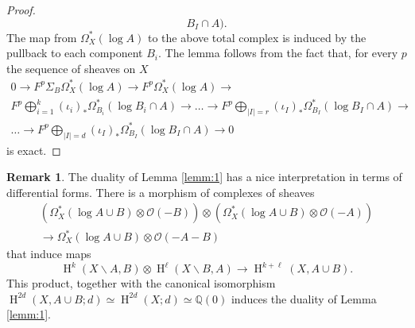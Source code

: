 \documentclass[11pt,a4paper]{amsart}
\newcommand{\Q}{\mathds{Q}}
\newcommand{\caO}{\mathcal{O}}
\DeclareMathOperator{\rH}{H}
\numberwithin{equation}{section}
\theoremstyle{plain}
\theoremstyle{definition}
\newtheorem{rmk}[prop]{Remark}
\begin{document}
\begin{proof}
\begin{displaymath}
    B_{I}\cap A). 
  \end{displaymath}
  The map from $\Omega ^{\ast}_{X}(\log A)$ to the above total complex
  is induced by the pullback to each component $B_i$. The lemma
  follows from the fact that, for every $p$ the sequence of sheaves on $X$
  \begin{multline*}
    0\longrightarrow
    F^{p}\Sigma _B\Omega^{\ast}_{X}(\log A)
    \longrightarrow
    F^{p}\Omega^{\ast}_{X}(\log A)
    \longrightarrow\\
    F^{p}\bigoplus _{i=1}^{k}
    (\iota_{i})_{\ast}\Omega^{\ast}_{B_{i}}(\log B_{i}\cap A)
    \longrightarrow  \dots
    \longrightarrow
    F^{p}\bigoplus _{|I|=r}
    (\iota_{I})_{\ast}\Omega^{\ast}_{B_{I}}(\log B_{I}\cap A)\longrightarrow
    \\\dots \longrightarrow
    F^{p}\bigoplus _{|I|=d}
    (\iota_{I})_{\ast}\Omega^{\ast}_{B_{I}}(\log B_{I}\cap A)
    \longrightarrow 0
  \end{multline*}
  is exact.
\end{proof}

\begin{rmk}  The duality of Lemma \ref{lemm:1} has a nice
  interpretation in terms of differential forms. 
  There is a morphism of complexes of sheaves
  \begin{multline}
    \label{eq:22}
    (\Omega ^{\ast}_{X}(\log A\cup B)\otimes \caO(-B))
    \otimes
    (\Omega ^{\ast}_{X}(\log A\cup B)\otimes \caO(-A))\\
    \longrightarrow \Omega ^{\ast}_{X}(\log A\cup B)\otimes \caO(-A-B) 
  \end{multline}
  that induce maps
  \begin{displaymath}
    \rH^{k}(X\smallsetminus A,B)\otimes
    \rH^{\ell}(X\smallsetminus B,A)
    \longrightarrow
    \rH^{k+\ell}(X,A\cup B).
  \end{displaymath}
  This product, together with the canonical isomorphism
  $\rH^{2d}(X,A\cup B;d)\simeq \rH^{2d}(X;d) \simeq \Q(0)$ induces the duality 
  of Lemma \ref{lemm:1}.
\end{rmk}
\end{document}
